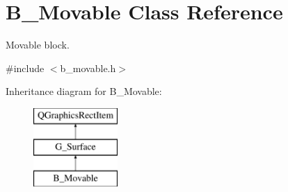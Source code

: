 \hypertarget{class_b___movable}{}\section{B\+\_\+\+Movable Class Reference}
\label{class_b___movable}


Movable block.  




{\ttfamily \#include $<$b\+\_\+movable.\+h$>$}

Inheritance diagram for B\+\_\+\+Movable\+:\begin{figure}[H]
\begin{center}
\leavevmode
\includegraphics[height=3.000000cm]{class_b___movable}
\end{center}
\end{figure}

